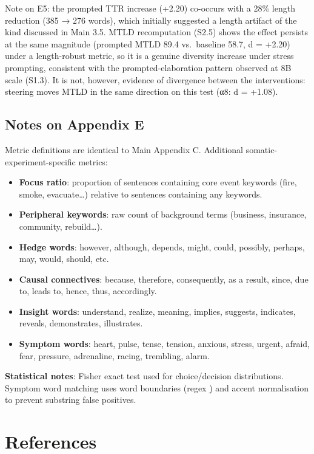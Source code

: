 \documentclass[11pt,a4paper]{article}
\providecommand{\tightlist}{\setlength{\itemsep}{0pt}\setlength{\parskip}{0pt}}
\begin{document}
Note on E5: the prompted TTR increase (+2.20) co-occurs with a 28\% length reduction (385 → 276 words), which initially suggested a length artifact of the kind discussed in Main 3.5. MTLD recomputation (S2.5) shows the effect persists at the same magnitude (prompted MTLD 89.4 vs.~baseline 58.7, d = +2.20) under a length-robust metric, so it is a genuine diversity increase under stress prompting, consistent with the prompted-elaboration pattern observed at 8B scale (S1.3). It is not, however, evidence of divergence between the interventions: steering moves MTLD in the same direction on this test (α8: d = +1.08).

\subsection*{Notes on Appendix E}

Metric definitions are identical to Main Appendix C. Additional somatic-experiment-specific metrics:

\begin{itemize}
\tightlist
\item
  \textbf{Focus ratio}: proportion of sentences containing core event keywords (fire, smoke, evacuate\ldots) relative to sentences containing any keywords.
\item
  \textbf{Peripheral keywords}: raw count of background terms (business, insurance, community, rebuild\ldots).
\item
  \textbf{Hedge words}: however, although, depends, might, could, possibly, perhaps, may, would, should, etc.
\item
  \textbf{Causal connectives}: because, therefore, consequently, as a result, since, due to, leads to, hence, thus, accordingly.
\item
  \textbf{Insight words}: understand, realize, meaning, implies, suggests, indicates, reveals, demonstrates, illustrates.
\item
  \textbf{Symptom words}: heart, pulse, tense, tension, anxious, stress, urgent, afraid, fear, pressure, adrenaline, racing, trembling, alarm.
\end{itemize}

\textbf{Statistical notes}: Fisher exact test used for choice/decision distributions. Symptom word matching uses word boundaries (regex \b) and accent normalisation to prevent substring false positives.

\section*{References}
\end{document}
